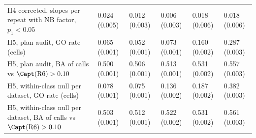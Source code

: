 \begin{tabular}{@{}>{\raggedright\arraybackslash}p{4.7cm} lllll@{}}
H4 corrected, slopes per repeat with NB factor, $p_1<0.05$ & 0.024 (0.005) & 0.012 (0.003) & 0.006 (0.003) & 0.018 (0.006) & 0.018 (0.006) \\
H5, plan audit, GO rate (cells) & 0.065 (0.001) & 0.052 (0.001) & 0.073 (0.001) & 0.160 (0.002) & 0.287 (0.003) \\
H5, plan audit, BA of calls vs $\Capt(\mathrm{R6})>0.10$ & 0.500 (0.001) & 0.506 (0.001) & 0.513 (0.001) & 0.531 (0.002) & 0.557 (0.003) \\
H5, within-class null per dataset, GO rate (cells) & 0.078 (0.001) & 0.075 (0.001) & 0.136 (0.002) & 0.187 (0.002) & 0.382 (0.003) \\
H5, within-class null per dataset, BA of calls vs $\Capt(\mathrm{R6})>0.10$ & 0.503 (0.001) & 0.512 (0.001) & 0.522 (0.002) & 0.531 (0.002) & 0.561 (0.003) \\
\bottomrule
\end{tabular}
